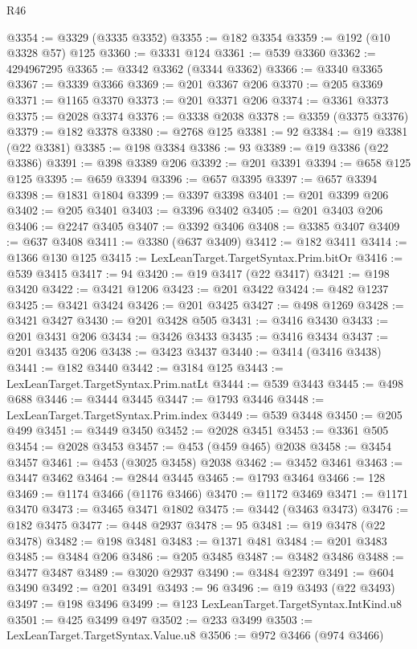 \begin{lexlean}{R46}
\begin{coremodule}
@3354 := @3329 (@3335 @3352)
@3355 := @182 @3354
@3359 := @192 (@10 @3328 @57) @125
@3360 := @3331 @124
@3361 := @539 @3360
@3362 := 4294967295
@3365 := @3342 @3362 (@3344 @3362)
@3366 := @3340 @3365
@3367 := @3339 @3366
@3369 := @201 @3367 @206
@3370 := @205 @3369
@3371 := @1165 @3370
@3373 := @201 @3371 @206
@3374 := @3361 @3373
@3375 := @2028 @3374
@3376 := @3338 @2038
@3378 := @3359 (@3375 @3376)
@3379 := @182 @3378
@3380 := @2768 @125
@3381 := 92
@3384 := @19 @3381 (@22 @3381)
@3385 := @198 @3384
@3386 := 93
@3389 := @19 @3386 (@22 @3386)
@3391 := @398 @3389 @206
@3392 := @201 @3391
@3394 := @658 @125 @125
@3395 := @659 @3394
@3396 := @657 @3395
@3397 := @657 @3394
@3398 := @1831 @1804
@3399 := @3397 @3398
@3401 := @201 @3399 @206
@3402 := @205 @3401
@3403 := @3396 @3402
@3405 := @201 @3403 @206
@3406 := @2247 @3405
@3407 := @3392 @3406
@3408 := @3385 @3407
@3409 := @637 @3408
@3411 := @3380 (@637 @3409)
@3412 := @182 @3411
@3414 := @1366 @130 @125
@3415 := LexLeanTarget.TargetSyntax.Prim.bitOr
@3416 := @539 @3415
@3417 := 94
@3420 := @19 @3417 (@22 @3417)
@3421 := @198 @3420
@3422 := @3421 @1206
@3423 := @201 @3422
@3424 := @482 @1237
@3425 := @3421 @3424
@3426 := @201 @3425
@3427 := @498 @1269
@3428 := @3421 @3427
@3430 := @201 @3428 @505
@3431 := @3416 @3430
@3433 := @201 @3431 @206
@3434 := @3426 @3433
@3435 := @3416 @3434
@3437 := @201 @3435 @206
@3438 := @3423 @3437
@3440 := @3414 (@3416 @3438)
@3441 := @182 @3440
@3442 := @3184 @125
@3443 := LexLeanTarget.TargetSyntax.Prim.natLt
@3444 := @539 @3443
@3445 := @498 @688
@3446 := @3444 @3445
@3447 := @1793 @3446
@3448 := LexLeanTarget.TargetSyntax.Prim.index
@3449 := @539 @3448
@3450 := @205 @499
@3451 := @3449 @3450
@3452 := @2028 @3451
@3453 := @3361 @505
@3454 := @2028 @3453
@3457 := @453 (@459 @465) @2038
@3458 := @3454 @3457
@3461 := @453 (@3025 @3458) @2038
@3462 := @3452 @3461
@3463 := @3447 @3462
@3464 := @2844 @3445
@3465 := @1793 @3464
@3466 := 128
@3469 := @1174 @3466 (@1176 @3466)
@3470 := @1172 @3469
@3471 := @1171 @3470
@3473 := @3465 @3471 @1802
@3475 := @3442 (@3463 @3473)
@3476 := @182 @3475
@3477 := @448 @2937
@3478 := 95
@3481 := @19 @3478 (@22 @3478)
@3482 := @198 @3481
@3483 := @1371 @481
@3484 := @201 @3483
@3485 := @3484 @206
@3486 := @205 @3485
@3487 := @3482 @3486
@3488 := @3477 @3487
@3489 := @3020 @2937
@3490 := @3484 @2397
@3491 := @604 @3490
@3492 := @201 @3491
@3493 := 96
@3496 := @19 @3493 (@22 @3493)
@3497 := @198 @3496
@3499 := @123 LexLeanTarget.TargetSyntax.IntKind.u8
@3501 := @425 @3499 @497
@3502 := @233 @3499
@3503 := LexLeanTarget.TargetSyntax.Value.u8
@3506 := @972 @3466 (@974 @3466)

\end{coremodule}
\end{lexlean}
